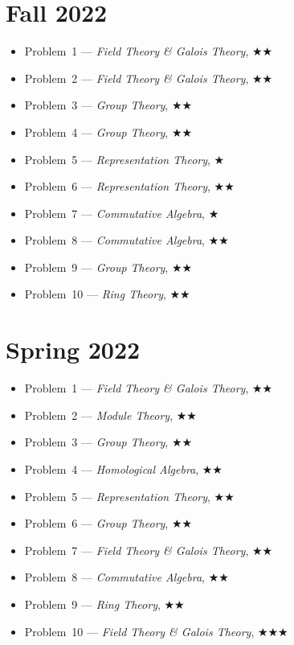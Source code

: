 \documentclass[11pt,letterpaper]{book}
\begin{document}
\section*{Fall 2022}
\begin{itemize}
\item Problem~1 --- \textit{Field Theory \& Galois Theory}, $\bigstar\bigstar$
\item Problem~2 --- \textit{Field Theory \& Galois Theory}, $\bigstar\bigstar$
\item Problem~3 --- \textit{Group Theory}, $\bigstar\bigstar$
\item Problem~4 --- \textit{Group Theory}, $\bigstar\bigstar$
\item Problem~5 --- \textit{Representation Theory}, $\bigstar$
\item Problem~6 --- \textit{Representation Theory}, $\bigstar\bigstar$
\item Problem~7 --- \textit{Commutative Algebra}, $\bigstar$
\item Problem~8 --- \textit{Commutative Algebra}, $\bigstar\bigstar$
\item Problem~9 --- \textit{Group Theory}, $\bigstar\bigstar$
\item Problem~10 --- \textit{Ring Theory}, $\bigstar\bigstar$
\end{itemize}

\section*{Spring 2022}
\begin{itemize}
\item Problem~1 --- \textit{Field Theory \& Galois Theory}, $\bigstar\bigstar$
\item Problem~2 --- \textit{Module Theory}, $\bigstar\bigstar$
\item Problem~3 --- \textit{Group Theory}, $\bigstar\bigstar$
\item Problem~4 --- \textit{Homological Algebra}, $\bigstar\bigstar$
\item Problem~5 --- \textit{Representation Theory}, $\bigstar\bigstar$
\item Problem~6 --- \textit{Group Theory}, $\bigstar\bigstar$
\item Problem~7 --- \textit{Field Theory \& Galois Theory}, $\bigstar\bigstar$
\item Problem~8 --- \textit{Commutative Algebra}, $\bigstar\bigstar$
\item Problem~9 --- \textit{Ring Theory}, $\bigstar\bigstar$
\item Problem~10 --- \textit{Field Theory \& Galois Theory}, $\bigstar\bigstar\bigstar$
\end{itemize}
\end{document}
